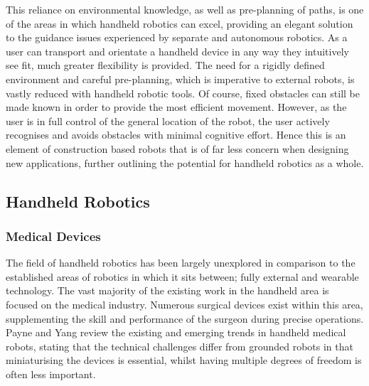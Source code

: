 \documentclass[11pt]{article}
\begin{document}
This reliance on environmental knowledge, as well as pre-planning of paths, is one of the areas in which handheld robotics can excel, providing an elegant solution to the guidance issues experienced by separate and autonomous robotics. As a user can transport and orientate a handheld device in any way they intuitively see fit, much greater flexibility is provided. The need for a rigidly defined environment and careful pre-planning, which is imperative to external robots, is vastly reduced with handheld robotic tools. Of course, fixed obstacles can still be made known in order to provide the most efficient movement. However, as the user is in full control of the general location of the robot, the user actively recognises and avoids obstacles with minimal cognitive effort. Hence this is an element of construction based robots that is of far less concern when designing new applications, further outlining the potential for handheld robotics as a whole. 

\pagebreak












\subsection{Handheld Robotics} \label{handheld}
\subsubsection{Medical Devices}
The field of handheld robotics has been largely unexplored in comparison to the established areas of robotics in which it sits between; fully external and wearable technology. The vast majority of the existing work in the handheld area is focused on the medical industry. Numerous surgical devices exist within this area, supplementing the skill and performance of the surgeon during precise operations. Payne and Yang \cite{Payne2014} review the existing and emerging trends in handheld medical robots, stating that the technical challenges differ from grounded robots in that miniaturising the devices is essential, whilst having multiple degrees of freedom is often less important.
\end{document}
